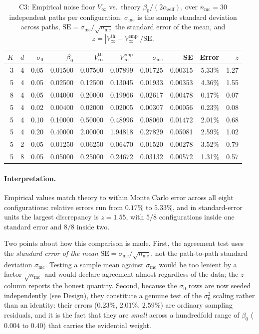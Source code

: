 \documentclass[12pt]{article}
\theoremstyle{plain}
\theoremstyle{definition}
\begin{document}
\begin{table}[H]
\centering
\caption{C3: Empirical noise floor $V_\infty$ vs.\ theory $\beta_0/(2\alpha_{\mathrm{self}})$,
over $n_{\mathrm{mc}}=30$ independent paths per configuration.  $\sigma_{\mathrm{mc}}$ is the sample
standard deviation across paths, $\mathrm{SE}=\sigma_{\mathrm{mc}}/\sqrt{n_{\mathrm{mc}}}$ the
standard error of the mean, and $z=|V^{\mathrm{th}}_\infty-V^{\mathrm{emp}}_\infty|/\mathrm{SE}$.}
\label{tab:c3}
\begin{tabular}{rrrrrrrrrr}
\toprule
$K$ & $d$ & $\sigma_0$ & $\beta_0$ &
$V_\infty^{\mathrm{th}}$ & $V_\infty^{\mathrm{emp}}$ &
$\sigma_{\mathrm{mc}}$ & SE & Error & $z$ \\
\midrule
3 & 4 & 0.05 & 0.01500 & 0.07500 & 0.07899 & 0.01725 & 0.00315 & 5.33\% & 1.27 \\
5 & 4 & 0.05 & 0.02500 & 0.12500 & 0.13045 & 0.01933 & 0.00353 & 4.36\% & 1.55 \\
8 & 4 & 0.05 & 0.04000 & 0.20000 & 0.19966 & 0.02617 & 0.00478 & 0.17\% & 0.07 \\
5 & 4 & 0.02 & 0.00400 & 0.02000 & 0.02005 & 0.00307 & 0.00056 & 0.23\% & 0.08 \\
5 & 4 & 0.10 & 0.10000 & 0.50000 & 0.48996 & 0.08060 & 0.01472 & 2.01\% & 0.68 \\
5 & 4 & 0.20 & 0.40000 & 2.00000 & 1.94818 & 0.27829 & 0.05081 & 2.59\% & 1.02 \\
5 & 2 & 0.05 & 0.01250 & 0.06250 & 0.06470 & 0.01520 & 0.00278 & 3.52\% & 0.79 \\
5 & 8 & 0.05 & 0.05000 & 0.25000 & 0.24672 & 0.03132 & 0.00572 & 1.31\% & 0.57 \\
\bottomrule
\end{tabular}
\end{table}

\paragraph{Interpretation.}
Empirical values match theory to within Monte Carlo error across all eight configurations: relative
errors run from $0.17\%$ to $5.33\%$, and in standard-error units the largest discrepancy is
$z = 1.55$, with $5/8$ configurations inside one standard error and $8/8$ inside two.

Two points about how this comparison is made. First, the agreement test uses the \emph{standard
error of the mean} $\mathrm{SE}=\sigma_{\mathrm{mc}}/\sqrt{n_{\mathrm{mc}}}$, not the path-to-path
standard deviation $\sigma_{\mathrm{mc}}$. Testing a sample mean against $\sigma_{\mathrm{mc}}$ would
be too lenient by a factor $\sqrt{n_{\mathrm{mc}}}$ and would declare agreement almost regardless of
the data; the $z$ column reports the honest quantity. Second, because the $\sigma_0$ rows are now
seeded independently (see Design), they constitute a genuine test of the $\sigma_0^2$ scaling rather
than an identity: their errors ($0.23\%$, $2.01\%$, $2.59\%$) are ordinary sampling residuals, and it
is the fact that they are \emph{small} across a hundredfold range of $\beta_0$
($0.004$ to $0.40$) that carries the evidential weight.
\end{document}

